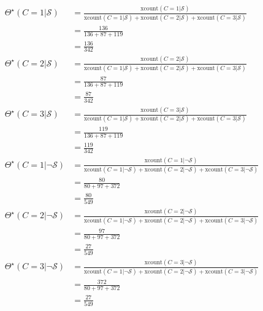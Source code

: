 \documentclass{tufte-handout}
\begin{document}
\begin{exercise}
\begin{boxedsolution}
\begin{align}
\Theta^\star(C=1 | \mathcal{S}) &= \frac{\mbox{xcount}(C=1| \mathcal{S})}{\mbox{xcount}(C=1| \mathcal{S}) + \mbox{xcount}(C=2| \mathcal{S})  + \mbox{xcount}(C=3 | \mathcal{S}) } \nonumber \\
&= \frac{136}{136+87+119} \nonumber \\
&= \frac{136}{342} \nonumber \\
\Theta^\star(C=2 | \mathcal{S}) &= \frac{\mbox{xcount}(C=2| \mathcal{S})}{\mbox{xcount}(C=1| \mathcal{S}) + \mbox{xcount}(C=2| \mathcal{S})  + \mbox{xcount}(C=3|  \mathcal{S}) } \nonumber \\
&= \frac{87}{136+87+119} \nonumber \\
&= \frac{87}{342} \nonumber \\
\Theta^\star(C=3 | \mathcal{S}) &= \frac{\mbox{xcount}(C=3| \mathcal{S})}{\mbox{xcount}(C=1| \mathcal{S}) + \mbox{xcount}(C=2| \mathcal{S})  + \mbox{xcount}(C=3 | \mathcal{S}) } \nonumber \\
&= \frac{119}{136+87+119} \nonumber \\
&= \frac{119}{342} \nonumber \\
\Theta^\star(C=1 | \neg \mathcal{S}) &= \frac{\mbox{xcount}(C=1| \neg\mathcal{S})}{\mbox{xcount}(C=1|\neg \mathcal{S}) + \mbox{xcount}(C=2| \neg\mathcal{S})  + \mbox{xcount}(C=3|\neg  \mathcal{S}) } \nonumber \\
&= \frac{80}{80 + 97 + 372} \nonumber \\
&= \frac{80}{549} \nonumber \\
\Theta^\star(C=2 | \neg \mathcal{S}) &= \frac{\mbox{xcount}(C=2| \neg\mathcal{S})}{\mbox{xcount}(C=1| \neg\mathcal{S}) + \mbox{xcount}(C=2| \neg\mathcal{S})  + \mbox{xcount}(C=3 |\neg \mathcal{S}) } \nonumber \\
&= \frac{97}{80 + 97 + 372} \nonumber \\
&= \frac{27}{549} \nonumber \\
\Theta^\star(C=3 | \neg \mathcal{S}) &= \frac{\mbox{xcount}(C=3| \neg\mathcal{S})}{\mbox{xcount}(C=1| \neg\mathcal{S}) + \mbox{xcount}(C=2| \neg\mathcal{S})  + \mbox{xcount}(C=3 | \neg\mathcal{S}) } \nonumber \\
&= \frac{372}{80 + 97 + 372} \nonumber \\
&= \frac{27}{549} \nonumber 
\end{align}

\end{boxedsolution}

\end{exercise}
\end{document}
